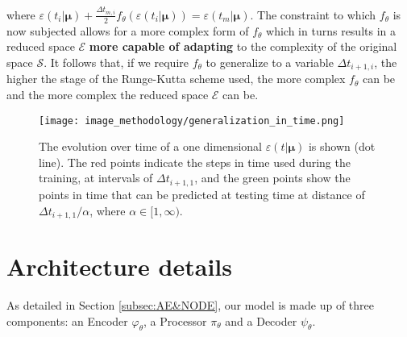 where $\varepsilon(t_{i}|\pmb{\mu})+\frac{ \Delta t_{m,i}}{2}f_\theta(\varepsilon(t_{i}|\pmb{\mu})) = \varepsilon(t_m|\pmb{\mu})$. The constraint to which $f_\theta$ is now subjected allows for a more complex form of $f_\theta$ which in turns results in a reduced space $\mathcal{E}$ \textbf{more capable of adapting} to the complexity of the original space $\mathcal{S}$. It follows that, if we require $f_\theta$ to generalize to a variable $\Delta t_{i+1,i}$, the higher the stage of the Runge-Kutta scheme used, the more complex $f_\theta$ can be and the more complex the reduced space $\mathcal{E}$ can be.
\begin{figure}
  \centering
  \texttt{[image: image\_methodology/generalization\_in\_time.png]}
  \caption{The evolution over time of a one dimensional $\varepsilon(t|\pmb{\mu})$ is shown (dot line). The red points indicate the steps in time used during the training, at intervals of $\Delta t_{i+1,1}$, and the green points show the points in time that can be predicted at testing time at distance of $\Delta t_{i+1,1}/\alpha$, where $\alpha\in[1,\infty)$.}
  \label{fig:inference_in_time}
\end{figure}

\section{Architecture details}
\label{subsec:architecture}
As detailed in Section \ref{subsec:AE&NODE}, our model is made up of three components: an Encoder $\varphi_\theta$, a Processor $\pi_\theta$ and a Decoder $\psi_\theta$.\\

